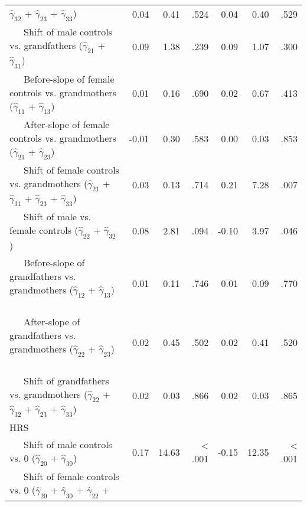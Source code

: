 \documentclass[
  english,
  man,floatsintext]{apa7}
\newenvironment{lltable}{\begin{landscape}\begin{center}\begin{ThreePartTable}}{\end{ThreePartTable}\end{center}\end{landscape}}
\begin{document}
\begin{lltable}
{\begin{longtable}{lrrrrrr}
                              $\hat{\gamma}_{32}$ + $\hat{\gamma}_{23}$ +
                              $\hat{\gamma}_{33}$) \textcolor{white}{L} & 0.04 & 0.41 & .524 & 0.04 & 0.40 & .529\\
\ \ \ Shift of male controls vs. grandfathers 
                              ($\hat{\gamma}_{21}$ + $\hat{\gamma}_{31}$) \textcolor{white}{L} & 0.09 & 1.38 & .239 & 0.09 & 1.07 & .300\\
\ \ \ Before-slope of female controls vs. grandmothers 
                              ($\hat{\gamma}_{11}$ + $\hat{\gamma}_{13}$) \textcolor{white}{L} & 0.01 & 0.16 & .690 & 0.02 & 0.67 & .413\\
\ \ \ After-slope of female controls vs. grandmothers 
                              ($\hat{\gamma}_{21}$ + $\hat{\gamma}_{23}$) \textcolor{white}{L} & -0.01 & 0.30 & .583 & 0.00 & 0.03 & .853\\
\ \ \ Shift of female controls vs. grandmothers 
                              ($\hat{\gamma}_{21}$ + $\hat{\gamma}_{31}$ + 
                              $\hat{\gamma}_{23}$ + $\hat{\gamma}_{33}$) \textcolor{white}{L} & 0.03 & 0.13 & .714 & 0.21 & 7.28 & .007\\
\ \ \ Shift of male vs. female controls 
                              ($\hat{\gamma}_{22}$ + $\hat{\gamma}_{32}$) \textcolor{white}{L} & 0.08 & 2.81 & .094 & -0.10 & 3.97 & .046\\
\ \ \ Before-slope of grandfathers vs. grandmothers 
                              ($\hat{\gamma}_{12}$ + $\hat{\gamma}_{13}$) \textcolor{white}{L} & 0.01 & 0.11 & .746 & 0.01 & 0.09 & .770\\
\ \ \ After-slope of grandfathers vs. grandmothers 
                              ($\hat{\gamma}_{22}$ + $\hat{\gamma}_{23}$) \textcolor{white}{L} & 0.02 & 0.45 & .502 & 0.02 & 0.41 & .520\\
\ \ \ Shift of grandfathers vs. grandmothers 
                              ($\hat{\gamma}_{22}$ + $\hat{\gamma}_{32}$ + 
                              $\hat{\gamma}_{23}$ + $\hat{\gamma}_{33}$) \textcolor{white}{L} & 0.02 & 0.03 & .866 & 0.02 & 0.03 & .865\\
HRS &  &  &  &  &  & \\
\ \ \ Shift of male controls vs. 0 ($\hat{\gamma}_{20}$ + 
                              $\hat{\gamma}_{30}$) \textcolor{white}{H} & 0.17 & 14.63 & < .001 & -0.15 & 12.35 & < .001\\
\ \ \ Shift of female controls vs. 0 ($\hat{\gamma}_{20}$ + 
                              $\hat{\gamma}_{30}$ + $\hat{\gamma}_{22}$ + 

\end{longtable}}
\end{lltable}
\end{document}
